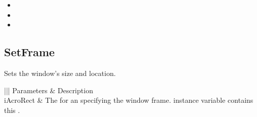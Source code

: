 \documentclass[letterpaper,12pt,english,openany,oneside]{sphinxmanual}
\begin{document}
\label{\detokenize{IAC_API_OLE_Objects:related-methods-43}}
\begin{itemize}
\item {} 
 

\item {} 
 

\item {} 
 

\end{itemize}




\subsection{SetFrame}
\label{\detokenize{IAC_API_OLE_Objects:setframe-1}}\label{\detokenize{IAC_API_OLE_Objects:id4}}
Sets the window’s size and location.


\begin{sphinxVerbatim}[commandchars=\\\{\}]
  
\end{sphinxVerbatim}
\label{\detokenize{IAC_API_OLE_Objects:parameters-29}}


\begin{savenotes}\sphinxattablestart
\centering
{}\label{\detokenize{IAC_API_OLE_Objects:section-32}}\nobreak
\begin{tabular}[t]{|||}
\hline
\sphinxstyletheadfamily 
Parameters
&\sphinxstyletheadfamily 
Description
\\
\hline
iAcroRect
&
The  for an  specifying the window frame.  instance variable  contains this .
\\
\hline
\end{tabular}
\par
\sphinxattableend\end{savenotes}
\end{document}
